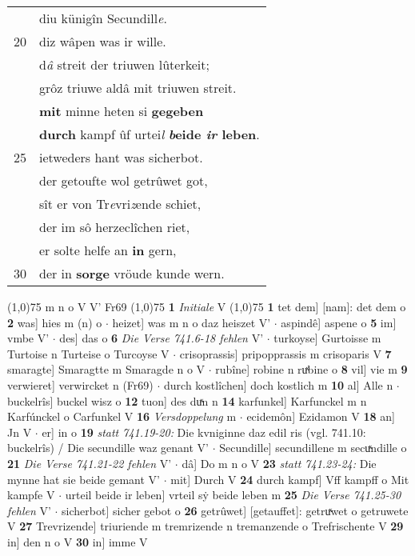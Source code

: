 \documentclass[8pt,a4paper,notitlepage]{article}
\begin{document}
\begin{table}[ht]
\begin{minipage}[t]{0.5\linewidth}
\begin{tabular}{rl}
 & diu künigîn Secundill\textit{e}.\\ 
20 & diz wâpen was ir wille.\\ 
 & d\textit{â} streit der triuwen lûterkeit;\\ 
 & grôz triuwe aldâ mit triuwen streit.\\ 
 & \textbf{mit} minne heten si \textbf{gegeben}\\ 
 & \textbf{durch} kampf ûf urtei\textit{l} \textbf{\textit{b}eide \textit{ir} leben}.\\ 
25 & ietweders hant was sicherbot.\\ 
 & der getoufte wol getrûwet got,\\ 
 & sît er von Tr\textit{e}vri\textit{z}ende schiet,\\ 
 & der im sô herzeclîchen riet,\\ 
 & er solte helfe an \textbf{in} gern,\\ 
30 & der in \textbf{sorge} vröude kunde wern.\\ 
\end{tabular}
\scriptsize
\line(1,0){75} \newline
m n o V V' Fr69 \newline
\line(1,0){75} \newline
\textbf{1} \textit{Initiale} V  \newline
\line(1,0){75} \newline
\textbf{1} tet dem] [nam]: det dem o \textbf{2} was] hies m (n) o  $\cdot$ heizet] was m n o daz heiszet V'  $\cdot$ aspindê] aspene o \textbf{5} im] vmbe V'  $\cdot$ des] das o \textbf{6} \textit{Die Verse 741.6-18 fehlen} V'   $\cdot$ turkoyse] Gurtoisse m Turtoise n Turteise o Turcoyse V  $\cdot$ crisoprassis] pripopprassis m crisoparis V \textbf{7} smaragte] Smaragtte m Smaragde n o V  $\cdot$ rubîne] robine n ruͯbine o \textbf{8} vil] vie m \textbf{9} verwieret] verwircket n (Fr69)  $\cdot$ durch kostlîchen] doch kostlich m \textbf{10} al] Alle n  $\cdot$ buckelrîs] buckel wisz o \textbf{12} tuon] des duͯn n \textbf{14} karfunkel] Karfunckel m n Karfúnckel o Carfunkel V \textbf{16} \textit{Versdoppelung} m   $\cdot$ ecidemôn] Ezidamon V \textbf{18} an] Jn V  $\cdot$ er] in o \textbf{19} \textit{statt 741.19-20:} Die kvniginne daz edil ris (vgl. 741.10: buckelrîs) / Die secundille waz genant V'   $\cdot$ Secundille] secundillene m secuͯndille o \textbf{21} \textit{Die Verse 741.21-22 fehlen} V'   $\cdot$ dâ] Do m n o V \textbf{23} \textit{statt 741.23-24:} Die mynne hat sie beide gemant V'   $\cdot$ mit] Durch V \textbf{24} durch kampf] Vff kampff o Mit kampfe V  $\cdot$ urteil beide ir leben] vrteil sẏ beide leben m \textbf{25} \textit{Die Verse 741.25-30 fehlen} V'   $\cdot$ sicherbot] sicher gebot o \textbf{26} getrûwet] [getauffet]: getruͯwet o getruwete V \textbf{27} Trevrizende] triuriende m tremrizende n tremanzende o Trefrischente V \textbf{29} in] den n o V \textbf{30} in] imme V \newline
\end{minipage}
\end{table}
\end{document}
